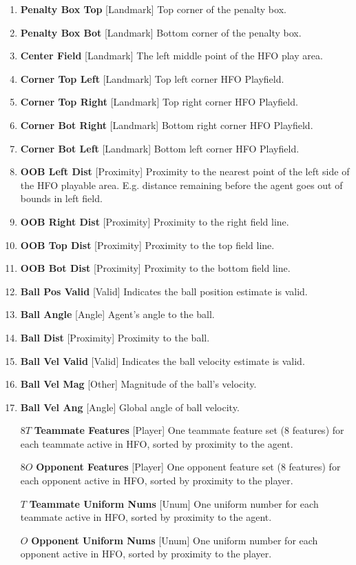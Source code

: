 \documentclass[12pt]{article}
\def\itemrange#1{%
\addtocounter{enumi}{1}%
\edef\labelenumi{\theenumi--\noexpand\theenumi}%
\addtocounter{enumi}{-1}%
\addtocounter{enumi}{#1}%
\item
\def\labelenumi{\theenumi}}
\renewcommand*{\labelenumi}{\theenumi}
\begin{document}
\begin{enumerate}[noitemsep]
  \itemrange{2}{\textbf{Penalty Box Top} [Landmark] Top corner of the penalty box.}
  \itemrange{2}{\textbf{Penalty Box Bot} [Landmark] Bottom corner of the penalty box.}
  \itemrange{2}{\textbf{Center Field} [Landmark] The left middle point of the
    HFO play area.}
  \itemrange{2}{\textbf{Corner Top Left} [Landmark] Top left corner HFO Playfield.}
  \itemrange{2}{\textbf{Corner Top Right} [Landmark] Top right corner HFO Playfield.}
  \itemrange{2}{\textbf{Corner Bot Right} [Landmark] Bottom right corner HFO Playfield.}
  \itemrange{2}{\textbf{Corner Bot Left} [Landmark] Bottom left corner HFO Playfield.}
  \item{\textbf{OOB Left Dist} [Proximity] Proximity to the nearest
    point of the left side of the HFO playable area. E.g. distance
    remaining before the agent goes out of bounds in left field.}
  \item{\textbf{OOB Right Dist} [Proximity] Proximity to the right
    field line.}
  \item{\textbf{OOB Top Dist} [Proximity] Proximity to the top field line.}
  \item{\textbf{OOB Bot Dist} [Proximity] Proximity to the bottom field line.}
  \item{\textbf{Ball Pos Valid} [Valid] Indicates the ball position estimate is valid.}
  \itemrange{1}{\textbf{Ball Angle} [Angle] Agent's angle to the ball.}
  \item{\textbf{Ball Dist} [Proximity] Proximity to the ball.}
  \item{\textbf{Ball Vel Valid} [Valid] Indicates the ball velocity estimate is valid.}
  \item{\textbf{Ball Vel Mag} [Other] Magnitude of the ball's velocity.}
  \itemrange{1}{\textbf{Ball Vel Ang} [Angle] Global angle of ball velocity.}
  \item [$8T$] {\textbf{Teammate Features} [Player] One teammate feature set (8 features)
	for each teammate active in HFO, sorted by proximity to the agent.}
  \item [$8O$] {\textbf{Opponent Features} [Player] One opponent feature set (8 features)
	for each opponent active in HFO, sorted by proximity to the player.}
  \item [$T$]  {\textbf{Teammate Uniform Nums} [Unum] One uniform number for each teammate active in HFO,
	sorted by proximity to the agent.}
  \item [$O$]  {\textbf{Opponent Uniform Nums} [Unum] One uniform number for each opponent active in HFO,
	sorted by proximity to the player.}
\end{enumerate}
\end{document}
